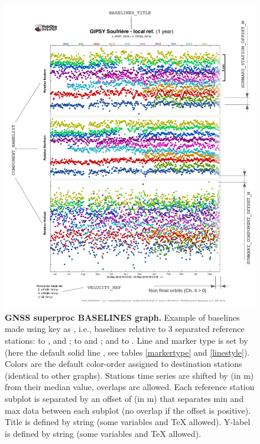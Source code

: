\begin{figure}
\centering
\includegraphics[width=\textwidth,page=3]{figures/gnss_superproc.pdf}
\caption{\textbf{GNSS superproc BASELINES graph.} Example of baselines made using  key as , i.e., baselines relative to 3 separated reference stations:  to ,  and ;  to  and ; and  to . Line and marker type is set by  (here the default solid line \wokey{-}, see tables \ref{markertype} and \ref{linestyle}). Colors are the default color-order assigned to destination stations (identical to other graphs). Stations time series are shifted by  (in m) from their median value, overlaps are allowed. Each reference station subplot is separated by an offset of  (in m) that separates min and max data between each subplot (no overlap if the offset is positive). Title is defined by  string (some variables and TeX allowed). Y-label is defined by  string (some variables and TeX allowed).}
\label{gnss_baselines}
\end{figure}

